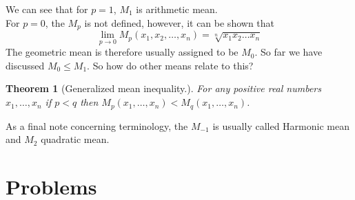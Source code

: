 \documentclass[11pt,a5paper]{article}
\newtheorem*{Theorem}{Theorem}
\begin{document}
\noindent We can see that for $p = 1$, $M_1$ is arithmetic mean. \\
For $p=0$, the $M_p$ is not defined, however, it can be shown that 
\[\lim_{p\to 0} M_p(x_1, x_2, \dots, x_n) = \sqrt[n]{x_1x_2\dots x_n}\]
The geometric mean is therefore usually assigned to be $M_0$. So far we have discussed 
$M_0 \le M_1$. So how do other means relate to this?

\begin{Theorem}[Generalized mean inequality.]
For any positive real numbers $x_1, \dots,  x_n$ if $p < q$ then $M_p(x_1, \dots, x_n) < M_q(x_1, \dots, x_n)$.
\end{Theorem}

\noindent As a final note concerning terminology, the $M_{-1}$ is usually called Harmonic mean and $M_2$ quadratic mean.

\section{Problems}
\end{document}
